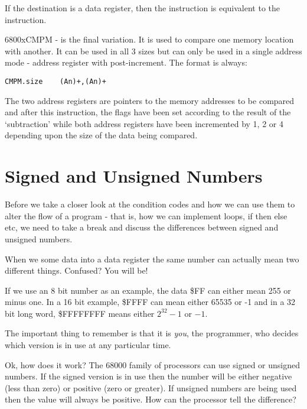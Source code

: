 If the destination is a data register, then the instruction is
    equivalent to the  instruction.

\mc6800x{CMPM} -{} is the final variation. It is used to compare one memory
    location with another. It can be used in all 3 sizes but can only be used
    in a single address mode -{} address register with post-increment. The format
    is always:

\begin{lstlisting}[firstnumber=1,]
          CMPM.size    (An)+,(An)+
\end{lstlisting}

The two address registers are pointers to the memory addresses to be
    compared and after this instruction, the flags have been set according to
    the result of the `subtraction' while both address registers have been
    incremented by 1, 2 or 4 depending upon the size of the data being
    compared.

\section{Signed and Unsigned Numbers}\label{sec-signed-unsigned-numbers}
\label{ch2-signed-unsinged}%

Before we take a closer look at the condition codes and how we can
    use them to alter the flow of a program -{} that is, how we can implement
    loops, if then else etc, we need to take a break and discuss the
    differences between signed and unsigned numbers.

When we  some data into a data register the same number can
    actually mean two different things. Confused? You will be!

If we use an 8 bit number as an example, the data \$FF can either
    mean 255 or minus one. In a 16 bit example, \$FFFF can mean either 65535 or -{}1 and
    in a 32 bit long word, \$FFFFFFFF means either $2^{32}-1$ or $-{}1$. 
    
The important thing to
    remember is that it is \emph{you}, the programmer, who decides which version is
    in use at any particular time.

Ok, how does it work? The 68000 family of processors can use signed
    or unsigned numbers. If the signed version is in use then the number will
    be either negative (less than zero) or positive (zero or greater). If
    unsigned numbers are being used then the value will always be positive.
    How can the processor tell the difference?

